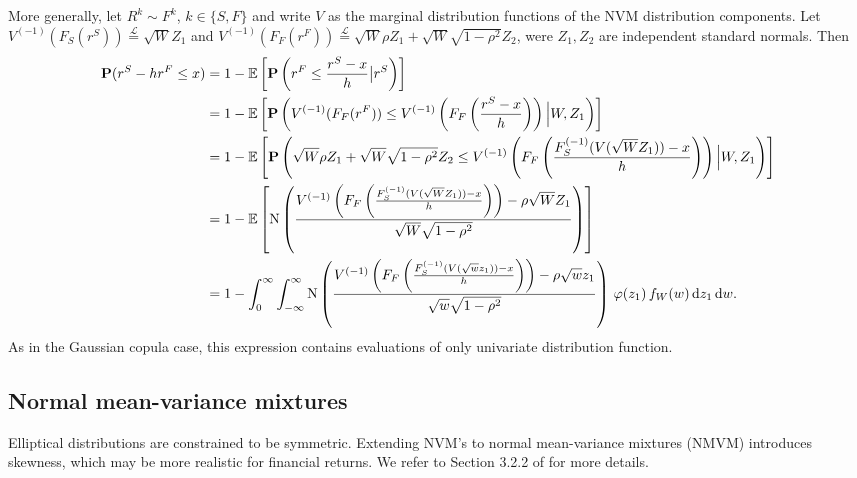 More generally, let $R^k\sim F^k$, $k\in \{S,F\}$ and write $V$
as the marginal distribution functions of the NVM distribution
components. Let $V^{(-1)}(F_S(r^S)) \stackrel{\mathcal L}{=} \sqrt{W}
Z_1$ and $V^{(-1)}(F_F(r^F)) \stackrel{\mathcal L}{=}
\sqrt{W} \rho Z_1 + \sqrt{W} \sqrt{1-\rho^2} Z_2$, were $Z_1, Z_2$ are
independent standard normals. Then 
\begin{align*}
  \p(r^S-h r^F\leq x)
  &= 1-\E\left[ \p\left(r^F\leq \frac{r^S-x}{h}\big| r^S\right)\right] \\ %
  &= 1-\E\left[\p \left(V^{(-1)}(F_F(r^F)) \leq
    V^{(-1)}\left(F_F\left(\frac{r^S-x}{h}\right)\right) \Big|
    W, Z_1\right)\right] \\%
  &= 1-\E\left[ \p\left(\sqrt{W} \rho Z_1 + \sqrt{W} \sqrt{1-\rho^2}
    Z_2\leq V^{(-1)}\left(F_F\left(\frac{F_S^{(-1)}(V(\sqrt{W}
    Z_1))-x}{h}\right)\right) \Big| W, Z_1\right)\right]\\ %
  &= 1-\E\left[ \Ncdf \left(
    \frac{V^{(-1)}\left(F_F\left(\frac{F_S^{(-1)}(V(\sqrt{W}
    Z_1))-x}{h}\right)\right) -\rho \sqrt{W} Z_1} {
    \sqrt{W}\sqrt{1-\rho^2}}\right)\right]\\ 
  &= 1-\int_0^\infty \int_{-\infty}^{\infty} \Ncdf \left(
    \frac{V^{(-1)}\left(F_F\left(\frac{F_S^{(-1)}(V(\sqrt{w}
    z_1))-x}{h}\right)\right) -\rho\sqrt{w} z_1} { \sqrt{w}
    \sqrt{1-\rho^2}}\right) \, \varphi(z_1)\, f_W(w)\, \dd z_1\, \dd
    w.%
\end{align*}
As in the Gaussian copula case, this expression contains evaluations
of only univariate distribution function. 

\subsection{Normal mean-variance mixtures}
\label{sec:normal-mean-variance}

Elliptical distributions are constrained to be symmetric. Extending
NVM's to normal mean-variance mixtures (NMVM) introduces skewness,
which may be more realistic for financial returns. We refer to Section
3.2.2 of \citep{McNeil2005} for more details.

